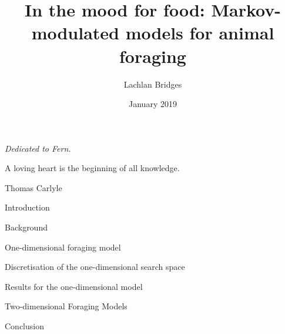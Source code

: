 \documentclass[a4paper,12pt]{book}
\title{In the mood for food: Markov-modulated models for animal foraging}
\author{Lachlan Bridges}
\date{January 2019}
\begin{document}
\frontmatter

\pagestyle{empty}
\maketitle



\tableofcontents
{}
\listoffigures


\newpage
\vspace*{8cm}
{\begin{center}\begin{huge}  \emph{Dedicated to Fern.} \end{huge} \end{center}}
\vfill
\epigraph{A loving heart is the beginning of all knowledge.}{Thomas Carlyle}
\newpage
\mainmatter
\pagestyle{fancy}


\begin{chapter}{Introduction \label{sec:introduction}}

\end{chapter}

\begin{chapter}{Background \label{sec:background}}

%

\end{chapter}


\begin{chapter}{One-dimensional foraging model\label{sec:1Dmodel}}




\end{chapter}


\begin{chapter}{Discretisation of the one-dimensional search space\label{sec:1d_discrete}}


\end{chapter}


\begin{chapter}{Results for the one-dimensional model \label{sec:1d_results}}

\end{chapter}

\begin{chapter}{Two-dimensional Foraging Models\label{sec:2dmodel}}

\end{chapter}

\begin{chapter}{Conclusion \label{sec:conclusion}}

\end{chapter}

\appendix



\backmatter

\printbibliography
\end{document}
